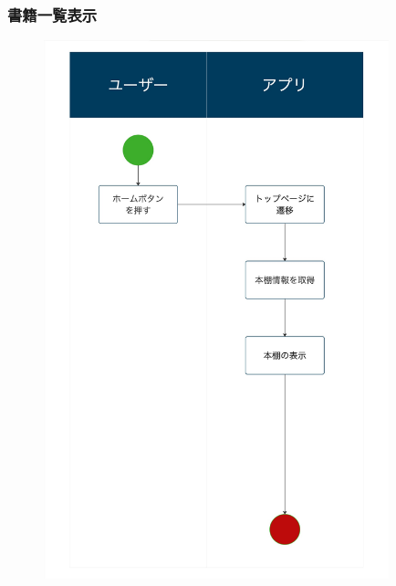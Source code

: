 \documentclass[a4paper, 11pt, titlepage]{jsarticle}
\begin{document}
\subsubsection{書籍一覧表示}
\begin{figure}[h]
\centering
\includegraphics[width=100mm]{flow-ichiran.jpg}
\label{fig:func}
\end{figure}

\clearpage
\end{document}
